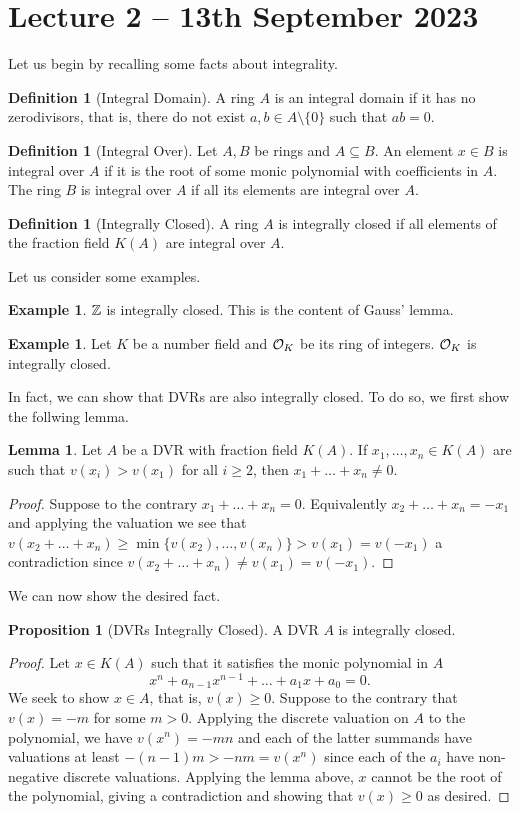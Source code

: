 \documentclass{amsart}
\theoremstyle{definition}
\newtheorem{lemma}[theorem]{Lemma}
\newtheorem{example}[theorem]{Example}
\newtheorem{proposition}[theorem]{Proposition}
\newtheorem{definition}[theorem]{Definition}
\numberwithin{equation}{section}
\begin{document}
\section{Lecture 2 -- 13th September 2023}
Let us begin by recalling some facts about integrality. 
\begin{definition}[Integral Domain]
  A ring $A$ is an integral domain if it has no zerodivisors, that is, there do not exist $a,b\in A\setminus\{0\}$ such that $ab=0$. 
\end{definition}
\begin{definition}[Integral Over]
  Let $A,B$ be rings and $A\subseteq B$. An element $x\in B$ is integral over $A$ if it is the root of some monic polynomial with coefficients in $A$. The ring $B$ is integral over $A$ if all its elements are integral over $A$. 
\end{definition}
\begin{definition}[Integrally Closed]
  A ring $A$ is integrally closed if all elements of the fraction field $K(A)$ are integral over $A$. 
\end{definition}
Let us consider some examples. 
\begin{example}
  $\mathbb{Z}$ is integrally closed. This is the content of Gauss' lemma. 
\end{example}
\begin{example}
  Let $K$ be a number field and $\mathcal{O}_{K}$ be its ring of integers. $\mathcal{O}_{K}$ is integrally closed. 
\end{example}
In fact, we can show that DVRs are also integrally closed. To do so, we first show the follwing lemma. 
\begin{lemma}
  Let $A$ be a DVR with fraction field $K(A)$. If $x_{1},\dots,x_{n}\in K(A)$ are such that $v(x_{i})>v(x_{1})$ for all $i\geq 2$, then $x_{1}+\dots+x_{n}\neq0$. 
\end{lemma}
\begin{proof}
  Suppose to the contrary $x_{1}+\dots+x_{n}=0$. Equivalently $x_{2}+\dots+x_{n}=-x_{1}$ and applying the valuation we see that $v(x_{2}+\dots+x_{n})\geq\min\{v(x_{2}),\dots,v(x_{n})\}>v(x_{1})=v(-x_{1})$ a contradiction since $v(x_{2}+\dots+x_{n})\neq v(x_{1})=v(-x_{1})$. 
\end{proof}
We can now show the desired fact. 
\begin{proposition}[DVRs Integrally Closed]\label{prop:DVR integrally closed}
  A DVR $A$ is integrally closed. 
\end{proposition}
\begin{proof}
Let $x\in K(A)$ such that it satisfies the monic polynomial in $A$
$$x^{n}+a_{n-1}x^{n-1}+\dots+a_{1}x+a_{0}=0.$$
We seek to show $x\in A$, that is, $v(x)\geq0$. Suppose to the contrary that $v(x)=-m$ for some $m>0$. Applying the discrete valuation on $A$ to the polynomial, we have $v(x^{n})=-mn$ and each of the latter summands have valuations at least $-(n-1)m>-nm=v(x^{n})$ since each of the $a_{i}$ have non-negative discrete valuations. Applying the lemma above, $x$ cannot be the root of the polynomial, giving a contradiction and showing that $v(x)\geq0$ as desired. 
\end{proof}
\end{document}
